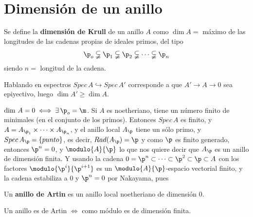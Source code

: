 \section{Dimensi\'on de un anillo}
\begin{defi} Se define la \textbf{dimensi\'on de Krull} de un anillo $A$ como
    $\dim A = $ m\'aximo de las longitudes de las cadenas propias de ideales primos, del tipo 
    $$\p_o \subsetneqq \p_1 \subsetneqq \p_2 \subsetneqq \cdots \subsetneqq \p_n$$
    siendo $n=$ longitud de la cadena. 

    Hablando en espectros $Spec\, A \hookrightarrow Spec\, A'$ corresponde a que $A' \longrightarrow A \to 0$ sea epiyectivo, luego $\dim A'\ge \dim A$. 
\end{defi}
\begin{ejem}
    $\dim \, A=0 \iff \exists\, \p_o = \m$. Si $A$ es noetheriano, tiene un n\'umero finito de minimales (en el conjunto de los primos). Entonces $Spec\, A$ es finito, y $A = A_{\p_1} \times \cdots \times A_{\p_n}$, y el anillo local $A_\p$ tiene un s\'olo primo, y $Spec\, A_\p = \{punto\}$, es decir, $Rad(A_\p) = \p$ y como $\p$ es finito generado, entonces $\p^n=0$, y $\modulo{A}{\p}$ lo que nos quiere decir que $A_{\p}$ es un anillo de dimensi\'on finita. Y usando la cadena $0 = \p^n  \subset \cdots  \subset \p^2  \subset \p  \subset A $ con los factores $\modulo{\p^i}{\p^{i+1}}$ es un $\modulo{A}{\p}$-espacio vectorial finito, y la cadena estabiliza a $0$ y $\p^n=0$ por Nakayama, pues 
\end{ejem}
\begin{defi}
    Un \textbf{anillo de Artin} es un anillo local noetheriano de dimensi\'on 0. 
\end{defi}
\begin{obs}
    Un anillo es de Artin $\iff$ como m\'odulo es de dimensi\'on finita.
\end{obs}

